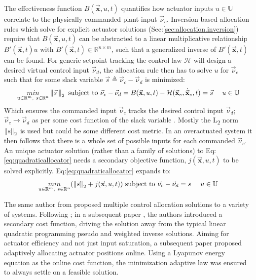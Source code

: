 \par
The effectiveness function $B(\vec{\mathbf{x}},u,t)$ quantifies how actuator inputs $u\in\mathbb{U}$ correlate to the physically commanded plant input $\vec{\nu}_c$. Inversion based allocation rules which solve for explicit actuator solutions (Sec:\ref{sec:allocation.inversion}) require that $B(\vec{\mathbf{x}},u,t)$ can be abstracted to a linear multiplicative relationship $B'(\vec{\mathbf{x}},t)u$ with $B'(\vec{\mathbf{x}},t)\in\mathbb{R}^{n\times m}$, such that a generalized inverse of $B'(\vec{\mathbf{x}},t)$ can be found. For generic setpoint tracking the control law $\mathcal{H}$ will design a desired virtual control input $\vec{\nu}_d$, the allocation rule then has to solve $u$ for $\vec{\nu}_c$ such that for some slack variable $\vec{s}\triangleq\vec{\nu}_c-\vec{\nu}_d$ is minimized:
\begin{equation}\label{eq:quadraticallocator}
\underset{u \in \mathbb{R}^m,~s \in \mathbb{R}^n}{min}\left\lVert\vec{s}\hspace{2pt}\right\rVert_2 ~\text{subject to} ~\vec{\nu}_c-\vec{\nu}_d=B(\vec{\mathbf{x}},u,t) - \mathcal{H}(\vec{\mathbf{x}}_e,\dot{\vec{\mathbf{x}}}_e,t)=\vec{s}~~~~u \in \mathbb{U}
\end{equation}
Which ensures the commanded input $\vec{\nu}_c$ tracks the desired control input $\vec{\nu}_d$;~$\vec{\nu}_c\rightarrow\vec{\nu}_d$ as per some cost function of the slack variable . Mostly the L\textsubscript{2} norm $\left\lVert s\right\rVert_2$ is used but could be some different cost metric. In an overactuated system it then follows that there is a whole set of possible inputs for each commanded $\vec{\nu}_c$. An unique actuator solution (rather than a family of solutions) to Eq:\ref{eq:quadraticallocator} needs a secondary objective function, $j(\vec{\mathbf{x}},u,t)$ to be solved explicitly. Eq:\ref{eq:quadraticallocator} expands to:
\begin{equation} \label{eq:quadraticallocatorcost}
\underset{u \in \mathbb{R}^m,~s \in \mathbb{R}^n}{min}(\left\lVert\vec{s}\right\rVert_2+j(\vec{\mathbf{x}},u,t)) ~\text{subject to} ~\vec{\nu}_c - \vec{\nu}_d=s~~~~u \in \mathbb{U}
\end{equation}
\par
The same author from \cite{allocation,efficientallocation,adaptiveallocation} proposed multiple control allocation solutions to a variety of systems. Following \cite{allocation}; in a subsequent paper \cite{efficientallocation}, the authors introduced a secondary cost function, driving the solution away from the typical linear quadratic programming pseudo and weighted inverse solutions.  Aiming for actuator efficiency and not just input saturation, a subsequent paper \cite{adaptiveallocation} proposed adaptively allocating actuator positions online. Using a Lyapunov energy equation as the online cost function, the minimization adaptive law was ensured to always settle on a feasible solution.
